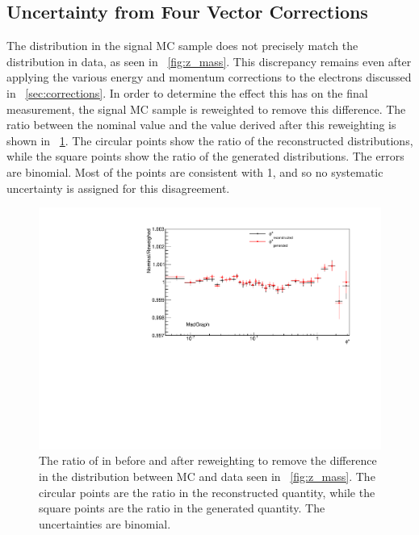 \subsection{Uncertainty from Four Vector Corrections}

The \mee distribution in the \MADGRAPH signal MC sample does not precisely
match the distribution in data, as seen in \FIG~\ref{fig:z_mass}. This
discrepancy remains even after applying the various energy and momentum
corrections to the electrons discussed in \SEC~\ref{sec:corrections}. In order
to determine the effect this has on the final measurement, the \MADGRAPH signal
MC sample is reweighted to remove this difference. The ratio between the
nominal \phistar value and the value derived after this reweighting is shown in
\FIG~\ref{fig:z_mass_reweighted}. The circular points show the ratio of the
reconstructed \phistar distributions, while the square points show the ratio of
the generated \phistar distributions. The errors are binomial. Most of the
points are consistent with \num{1}, and so no systematic uncertainty is
assigned for this disagreement.

\begin{figure}[!htbp]
    \centering
    \includegraphics[width=\textwidth]{figures/ZMass_reweighed.pdf}
    \caption[
        The ratio of \phistar in \MADGRAPH before and after reweighting to
        remove the differnce in the \mee distribution between MC and data.
    ]{
        The ratio of \phistar in \MADGRAPH before and after reweighting to
        remove the difference in the \mee distribution between MC and data seen
        in \FIG~\ref{fig:z_mass}. The circular points are the ratio in the
        reconstructed quantity, while the square points are the ratio in the
        generated quantity. The uncertainties are binomial.
    }
    \label{fig:z_mass_reweighted}
\end{figure}

